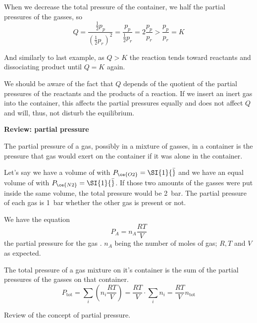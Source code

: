 \documentclass[../mit-general-chemistry.tex]{subfiles}
\begin{document}
When we decrease the total pressure of the container, we half the
partial pressures of the gasses, so
\begin{equation*}
  Q = \frac{\frac{1}{2}p_p}{(\frac{1}{2}p_r)^2}
  = \frac{p_p}{\frac{1}{2}p_r}
  = 2\frac{p_p}{p_r}
  > \frac{p_p}{p_r} = K
\end{equation*}

And similarly to last example, as $Q > K$ the reaction tends toward
reactants and dissociating product until $Q = K$ again.



We should be aware of the fact that $Q$ depends of the quotient of the
partial pressures of the reactants and the products of a reaction. If
we insert an inert gas into the container, this affects the partial
pressures equally and does not affect $Q$ and will, thus, not disturb
the equilibrium.



\begin{hfigure}
  \begin{remark}
    \textbf{Review: partial pressure}
    
    The partial pressure of a gas, possibly in a mixture of gasses, in a
    container is the pressure that gas would exert on the container if
    it was alone in the container.

    Let's say we have a volume of  with $P_{\ce{O2}} =
    \SI{1}{\bar}$ and we have an equal volume of  with
    $P_{\ce{N2}} = \SI{1}{\bar}$. If those two amounts of the gasses
    were put inside the same volume, the total pressure would be
    \SI{2}{\bar}. The partial pressure of each gas is \SI{1}{\bar}
    whether the other gas is present or not.

    We have the equation
    \begin{equation}
      P_A = n_A \frac{RT}{V}
    \end{equation}
    the partial pressure for the gas . $n_A$ being the number of
    moles of gas; $R, T$ and $V$ as expected.

    The total pressure of a gas mixture on it's container is the sum of
    the partial pressures of the gasses on that container.
    \begin{equation}
      P_{\text{tot}} = \sum_i \left(n_i\frac{RT}{V}\right)
      = \frac{RT}{V}\cdot\sum_i n_i
      = \frac{RT}{V} n_{\text{tot}}
    \end{equation}
  \end{remark}
  \caption{Review of the concept of partial pressure.}
\end{hfigure}
\end{document}
